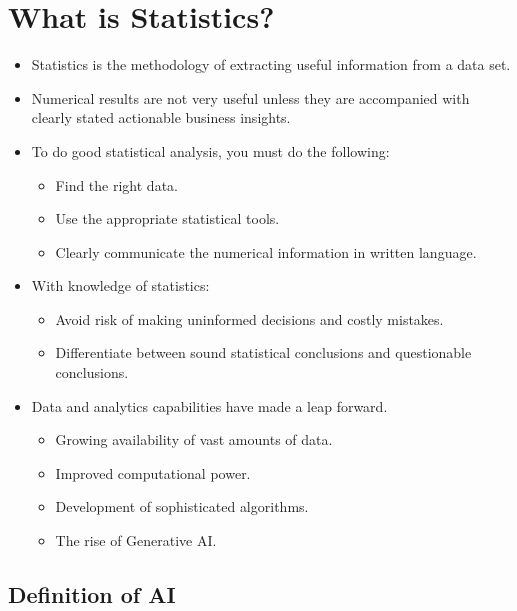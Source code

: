\documentclass[
  letterpaper,
  DIV=11,
  numbers=noendperiod]{scrreprt}
\providecommand{\tightlist}{%
  \setlength{\itemsep}{0pt}\setlength{\parskip}{0pt}}\usepackage{longtable,booktabs,array}
\begin{document}
\section{What is Statistics?}\label{what-is-statistics}

\begin{itemize}
\tightlist
\item
  Statistics is the methodology of extracting useful information from a
  data set.
\item
  Numerical results are not very useful unless they are accompanied with
  clearly stated actionable business insights.
\item
  To do good statistical analysis, you must do the following:

  \begin{itemize}
  \tightlist
  \item
    Find the right data.
  \item
    Use the appropriate statistical tools.
  \item
    Clearly communicate the numerical information in written language.
  \end{itemize}
\item
  With knowledge of statistics:

  \begin{itemize}
  \tightlist
  \item
    Avoid risk of making uninformed decisions and costly mistakes.
  \item
    Differentiate between sound statistical conclusions and questionable
    conclusions.
  \end{itemize}
\item
  Data and analytics capabilities have made a leap forward.

  \begin{itemize}
  \tightlist
  \item
    Growing availability of vast amounts of data.
  \item
    Improved computational power.
  \item
    Development of sophisticated algorithms.
  \item
    The rise of Generative AI.
  \end{itemize}
\end{itemize}

\subsection{Definition of AI}\label{definition-of-ai}
\end{document}
